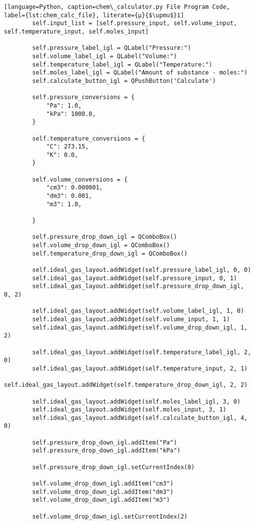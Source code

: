 \begin{lstlisting}[language=Python, caption=chem\_calculator.py File Program Code, label={lst:chem_calc_file}, literate={μ}{$\upmu$}1]
        self.input_list = [self.pressure_input, self.volume_input, self.temperature_input, self.moles_input]

        self.pressure_label_igl = QLabel("Pressure:")
        self.volume_label_igl = QLabel("Volume:")
        self.temperature_label_igl = QLabel("Temperature:")
        self.moles_label_igl = QLabel("Amount of substance - moles:")
        self.calculate_button_igl = QPushButton('Calculate')

        self.pressure_conversions = {
            "Pa": 1.0,
            "kPa": 1000.0,
        }

        self.temperature_conversions = {
            "C": 273.15,
            "K": 0.0,
        }

        self.volume_conversions = {
            "cm3": 0.000001,
            "dm3": 0.001,
            "m3": 1.0,

        }

        self.pressure_drop_down_igl = QComboBox()
        self.volume_drop_down_igl = QComboBox()
        self.temperature_drop_down_igl = QComboBox()

        self.ideal_gas_layout.addWidget(self.pressure_label_igl, 0, 0)
        self.ideal_gas_layout.addWidget(self.pressure_input, 0, 1)
        self.ideal_gas_layout.addWidget(self.pressure_drop_down_igl, 0, 2)

        self.ideal_gas_layout.addWidget(self.volume_label_igl, 1, 0)
        self.ideal_gas_layout.addWidget(self.volume_input, 1, 1)
        self.ideal_gas_layout.addWidget(self.volume_drop_down_igl, 1, 2)

        self.ideal_gas_layout.addWidget(self.temperature_label_igl, 2, 0)
        self.ideal_gas_layout.addWidget(self.temperature_input, 2, 1)
        self.ideal_gas_layout.addWidget(self.temperature_drop_down_igl, 2, 2)

        self.ideal_gas_layout.addWidget(self.moles_label_igl, 3, 0)
        self.ideal_gas_layout.addWidget(self.moles_input, 3, 1)
        self.ideal_gas_layout.addWidget(self.calculate_button_igl, 4, 0)

        self.pressure_drop_down_igl.addItem("Pa")
        self.pressure_drop_down_igl.addItem("kPa")

        self.pressure_drop_down_igl.setCurrentIndex(0)

        self.volume_drop_down_igl.addItem("cm3")
        self.volume_drop_down_igl.addItem("dm3")
        self.volume_drop_down_igl.addItem("m3")

        self.volume_drop_down_igl.setCurrentIndex(2)


\end{lstlisting}
